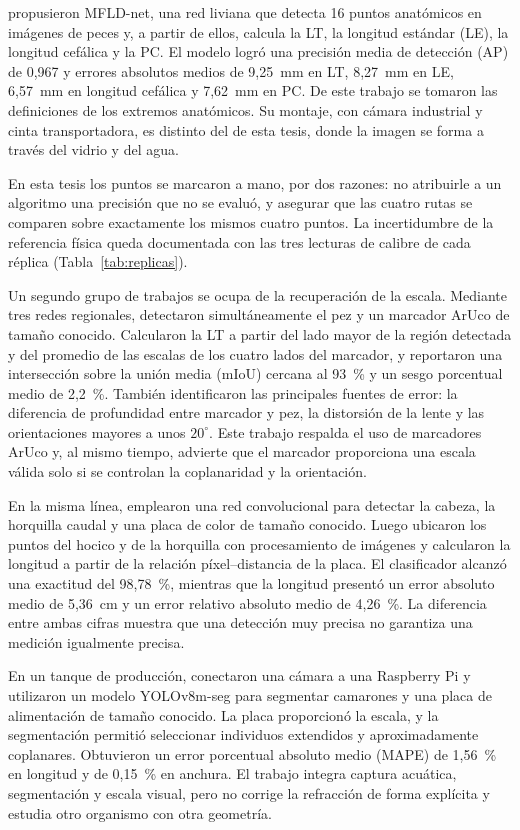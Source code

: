 \textcite{Saleh2023} propusieron MFLD-net, una red liviana que detecta 16 puntos anatómicos en imágenes de peces y, a partir de ellos, calcula la LT, la longitud estándar (LE), la longitud cefálica y la PC. El modelo logró una precisión media de detección (AP) de 0,967 y errores absolutos medios de 9,25~mm en LT, 8,27~mm en LE, 6,57~mm en longitud cefálica y 7,62~mm en PC. De este trabajo se tomaron las definiciones de los extremos anatómicos. Su montaje, con cámara industrial y cinta transportadora, es distinto del de esta tesis, donde la imagen se forma a través del vidrio y del agua.

En esta tesis los puntos se marcaron a mano, por dos razones: no atribuirle a un algoritmo una precisión que no se evaluó, y asegurar que las cuatro rutas se comparen sobre exactamente los mismos cuatro puntos. La incertidumbre de la referencia física queda documentada con las tres lecturas de calibre de cada réplica (Tabla~\ref{tab:replicas}).

Un segundo grupo de trabajos se ocupa de la recuperación de la escala. Mediante tres redes regionales, \textcite{Monkman2019} detectaron simultáneamente el pez y un marcador ArUco de tamaño conocido. Calcularon la LT a partir del lado mayor de la región detectada y del promedio de las escalas de los cuatro lados del marcador, y reportaron una intersección sobre la unión media (mIoU) cercana al 93~\% y un sesgo porcentual medio de 2,2~\%. También identificaron las principales fuentes de error: la diferencia de profundidad entre marcador y pez, la distorsión de la lente y las orientaciones mayores a unos $20^{\circ}$. Este trabajo respalda el uso de marcadores ArUco y, al mismo tiempo, advierte que el marcador proporciona una escala válida solo si se controlan la coplanaridad y la orientación.

En la misma línea, \textcite{Tseng2020} emplearon una red convolucional para detectar la cabeza, la horquilla caudal y una placa de color de tamaño conocido. Luego ubicaron los puntos del hocico y de la horquilla con procesamiento de imágenes y calcularon la longitud a partir de la relación píxel--distancia de la placa. El clasificador alcanzó una exactitud del 98,78~\%, mientras que la longitud presentó un error absoluto medio de 5,36~cm y un error relativo absoluto medio de 4,26~\%. La diferencia entre ambas cifras muestra que una detección muy precisa no garantiza una medición igualmente precisa.

En un tanque de producción, \textcite{Correia2025} conectaron una cámara a una Raspberry Pi y utilizaron un modelo YOLOv8m-seg para segmentar camarones y una placa de alimentación de tamaño conocido. La placa proporcionó la escala, y la segmentación permitió seleccionar individuos extendidos y aproximadamente coplanares. Obtuvieron un error porcentual absoluto medio (MAPE) de 1,56~\% en longitud y de 0,15~\% en anchura. El trabajo integra captura acuática, segmentación y escala visual, pero no corrige la refracción de forma explícita y estudia otro organismo con otra geometría.

